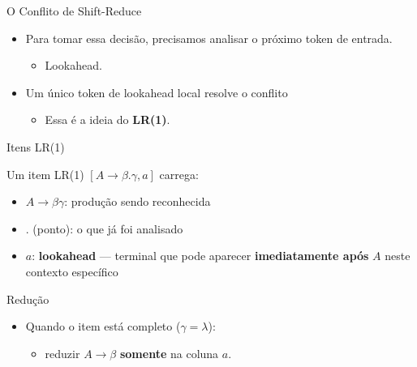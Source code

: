 \begin{frame}{O Conflito de Shift-Reduce}

    \begin{itemize}

        \item
        Para tomar essa decisão, precisamos analisar o próximo token de
        entrada.

        \begin{itemize}

            \item
            Lookahead.
        \end{itemize}
        \item
        Um único token de lookahead local resolve o conflito

        \begin{itemize}

            \item
            Essa é a ideia do \textbf{LR(1)}.
        \end{itemize}
    \end{itemize}
\end{frame}



\begin{frame}{Itens LR(1)}

    Um item LR(1) \([A \to \beta . \gamma, a]\) carrega:

    \begin{itemize}

        \item
        \(A \to \beta\gamma\): produção sendo reconhecida
        \item
        \(.\) (ponto): o que já foi analisado
        \item
        \(a\): \textbf{lookahead} --- terminal que pode aparecer
        \textbf{imediatamente após} \(A\) neste contexto específico
    \end{itemize}
\end{frame}

\begin{frame}{Redução}

    \begin{itemize}

        \item
        Quando o item está completo (\(\gamma = \lambda\)):

        \begin{itemize}

            \item
            reduzir \(A \to \beta\) \textbf{somente} na coluna \(a\).
        \end{itemize}
    \end{itemize}
\end{frame}

